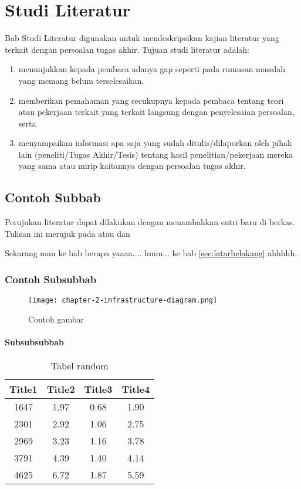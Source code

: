 \chapter{Studi Literatur}

Bab Studi Literatur digunakan untuk mendeskripsikan kajian literatur yang terkait dengan persoalan tugas akhir. Tujuan studi literatur adalah:

\begin{enumerate}
	\item menunjukkan kepada pembaca adanya gap seperti pada rumusan masalah yang memang belum terselesaikan,
	\item memberikan pemahaman yang secukupnya kepada pembaca tentang teori atau pekerjaan terkait yang terkait langsung dengan penyelesaian persoalan, serta
	\item menyampaikan informasi apa saja yang sudah ditulis/dilaporkan oleh pihak lain (peneliti/Tugas Akhir/Tesis) tentang hasil penelitian/pekerjaan mereka yang sama atau mirip kaitannya dengan persoalan tugas akhir.
\end{enumerate}


\section{Contoh Subbab}
Perujukan literatur dapat dilakukan dengan menambahkan entri baru di berkas. Tulisan ini merujuk pada \parencite{knuth2001art,vasp1} atau \parencite{4026885} dan \parencite{Kim2006}

Sekarang mau ke bab berapa yaaaa.... hmm... ke bab \ref{sec:latarbelakang} ahhhhh. 

\blindtext

\subsection{Contoh Subsubbab}

\blindtext

\begin{figure}[h]
	\centering
	\texttt{[image: chapter-2-infrastructure-diagram.png]}
	\caption{Contoh gambar}
\end{figure}

\subsubsection{Subsubsubbab}

\blindtext

\begin{table}[h]
	\caption{Tabel random}
	\vspace{0.25cm}
	\begin{center}
		\begin{tabular}{|c|c|c|c|}
			\hline
			Title1 & Title2 & Title3 & Title4  \tabularnewline
			\hline
			1647   & 1.97   & 0.68   & 1.90 \tabularnewline
			2301   & 2.92   & 1.06   & 2.75 \tabularnewline
			2969   & 3.23   & 1.16   & 3.78 \tabularnewline
			3791   & 4.39   & 1.40   & 4.14 \tabularnewline
			4625   & 6.72   & 1.87   & 5.59 \tabularnewline
			\hline
		\end{tabular}
	\end{center}
\end{table}

